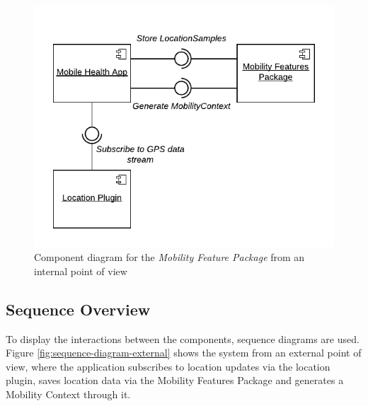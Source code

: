 \begin{figure}[h]
\centering
\includegraphics[width=\textwidth]{images/diagrams/component-external.pdf}
\caption{Component diagram for the \textit{Mobility Feature Package} from an internal point of view}
\label{fig:component-diagram-external}
\end{figure}


\subsection{Sequence Overview}
To display the interactions between the components, sequence diagrams are used. Figure \ref{fig:sequence-diagram-external} shows the system from an external point of view, where the application subscribes to location updates via the location plugin, saves location data via the Mobility Features Package and generates a Mobility Context through it. 

